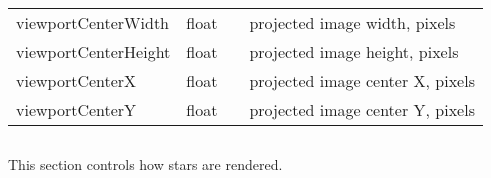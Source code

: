 \begin{longtable}{l|l|l|p{68mm}}
viewportCenterWidth    & float && projected image width, pixels\\%
viewportCenterHeight   & float && projected image height, pixels\\%
viewportCenterX        & float && projected image center X, pixels\\%
viewportCenterY        & float && projected image center Y, pixels\\
\bottomrule 
\end{longtable}

\subsection{}

This section controls how stars are rendered.

